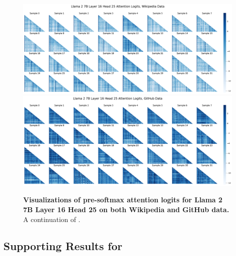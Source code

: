 \begin{figure}
    \centering
    \includegraphics[width=\textwidth]{Figures/L16_H25/attn_logits_l16h25_wiki.pdf}
    \includegraphics[width=\textwidth]{Figures/L16_H25/attn_logits_l16h25_github.pdf}
    \caption{\small\textbf{Visualizations of pre-softmax attention logits for Llama 2 7B Layer 16 Head 25 on both Wikipedia and GitHub data.} A continuation of .}
    \label{fig:attn_logits_l16_h25_improved}
\end{figure}

\subsection{Supporting Results for } \label{sub:app_supporting_controlled}

